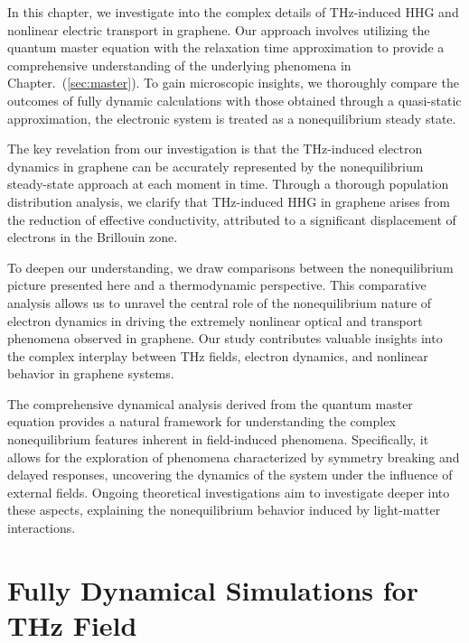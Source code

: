 In this chapter, we investigate into the complex details of  THz-induced \gls{HHG} and nonlinear electric transport in graphene. Our approach involves utilizing the quantum master equation with the relaxation time approximation to provide a comprehensive understanding of the underlying phenomena in Chapter.~(\ref{sec:master}). To gain microscopic insights, we thoroughly compare the outcomes of fully dynamic calculations with those obtained through a quasi-static approximation,  the electronic system is treated as a nonequilibrium steady state.

The key revelation from our investigation is that the THz-induced electron dynamics in graphene can be accurately represented by the nonequilibrium steady-state approach at each moment in time. Through a thorough population distribution analysis, we clarify that THz-induced HHG in graphene arises from the reduction of effective conductivity, attributed to a significant displacement of electrons in the Brillouin zone.

To deepen our understanding, we draw comparisons between the nonequilibrium picture presented here and a thermodynamic perspective. This comparative analysis allows us to unravel the central role of the nonequilibrium nature of electron dynamics in driving the extremely nonlinear optical and transport phenomena observed in graphene. Our study contributes valuable insights into the complex interplay between THz fields, electron dynamics, and nonlinear behavior in graphene systems.

The comprehensive dynamical analysis derived from the quantum master equation provides a natural framework for understanding the complex nonequilibrium features inherent in field-induced phenomena. Specifically, it allows for the exploration of phenomena characterized by symmetry breaking and delayed responses, uncovering the dynamics of the system under the influence of external fields. Ongoing theoretical investigations aim to investigate deeper into these aspects, explaining the nonequilibrium behavior induced by light-matter interactions.
\section{Fully Dynamical Simulations for THz Field \label{sec:dynamical_simulation}}

